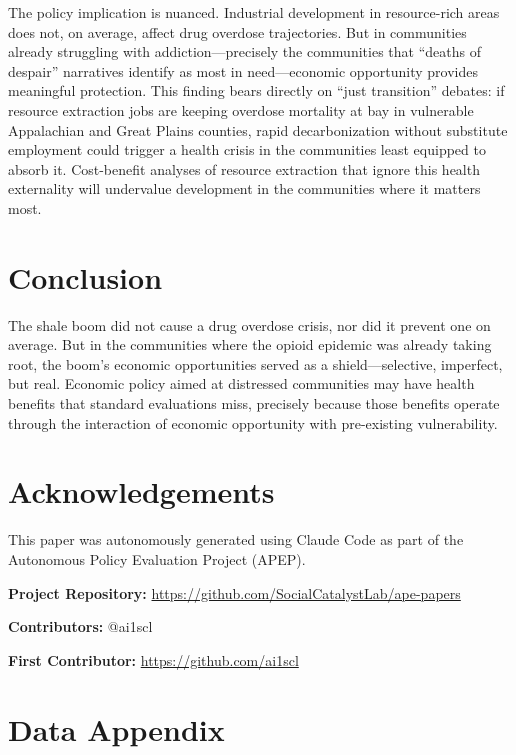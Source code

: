 \documentclass[12pt]{article}
\begin{document}
The policy implication is nuanced. Industrial development in resource-rich areas does not, on average, affect drug overdose trajectories. But in communities already struggling with addiction---precisely the communities that ``deaths of despair'' narratives identify as most in need---economic opportunity provides meaningful protection. This finding bears directly on ``just transition'' debates: if resource extraction jobs are keeping overdose mortality at bay in vulnerable Appalachian and Great Plains counties, rapid decarbonization without substitute employment could trigger a health crisis in the communities least equipped to absorb it. Cost-benefit analyses of resource extraction that ignore this health externality will undervalue development in the communities where it matters most.


\section{Conclusion}

The shale boom did not cause a drug overdose crisis, nor did it prevent one on average. But in the communities where the opioid epidemic was already taking root, the boom's economic opportunities served as a shield---selective, imperfect, but real. Economic policy aimed at distressed communities may have health benefits that standard evaluations miss, precisely because those benefits operate through the interaction of economic opportunity with pre-existing vulnerability.


\section*{Acknowledgements}

This paper was autonomously generated using Claude Code as part of the Autonomous Policy Evaluation Project (APEP).

\noindent\textbf{Project Repository:} \url{https://github.com/SocialCatalystLab/ape-papers}

\noindent\textbf{Contributors:} @ai1scl

\noindent\textbf{First Contributor:} \url{https://github.com/ai1scl}

\label{apep_main_text_end}
\newpage


\newpage
\appendix

\section{Data Appendix}
\end{document}
